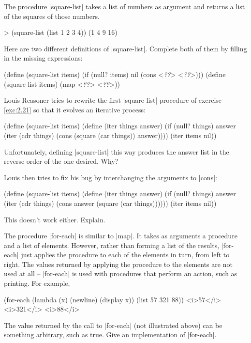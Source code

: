 \begin{Exercise}
\label{exc:2.21}
The procedure \scheme|square-list| takes a list of numbers as argument
and returns a list of the squares of those numbers.

\begin{schemedisplay}
> (square-list (list 1 2 3 4))
(1 4 9 16)
\end{schemedisplay}

Here are two different definitions of \scheme|square-list|.  Complete
both of them by filling in the missing expressions:

\begin{schemedisplay}
(define (square-list items)
  (if (null? items)
      nil
      (cons <\textit{??}> <\textit{??}>)))
(define (square-list items)
  (map <\textit{??}> <\textit{??}>))
\end{schemedisplay}
\end{Exercise}

\begin{Exercise}
\label{exc:2.22}
Louis Reasoner tries to rewrite the first \scheme|square-list| procedure of
exercise \ref{exc:2.21} so that it evolves an iterative
process:

\begin{schemedisplay}
(define (square-list items)
  (define (iter things answer)
    (if (null? things)
        answer
        (iter (cdr things) 
              (cons (square (car things))
                    answer))))
  (iter items nil))
\end{schemedisplay}
Unfortunately, defining \scheme|square-list| this way produces the
answer list in the reverse order of the one desired.  Why?

Louis then tries to fix his bug by interchanging the arguments to
\scheme|cons|:

\begin{schemedisplay}
(define (square-list items)
  (define (iter things answer)
    (if (null? things)
        answer
        (iter (cdr things)
              (cons answer
                    (square (car things))))))
  (iter items nil))
\end{schemedisplay}
This doesn't work either.  Explain.
\end{Exercise}

\begin{Exercise}
\label{exc:2.23}
The procedure \scheme|for-each| is similar to \scheme|map|.  It takes
as arguments a procedure and a list of elements.  However, rather than
forming a list of the results, \scheme|for-each| just applies the
procedure to each of the elements in turn, from left to right.  The
values returned by applying the procedure to the elements are not used
at all -- \scheme|for-each| is used with procedures that perform an
action, such as printing.  For example,
\begin{schemedisplay}
(for-each (lambda (x) (newline) (display x))
          (list 57 321 88))
<i>57</i>
<i>321</i>
<i>88</i>
\end{schemedisplay}
The value returned by the call to \scheme|for-each| (not illustrated
above) can be something arbitrary, such as true.  Give an
implementation of \scheme|for-each|.
\end{Exercise}

